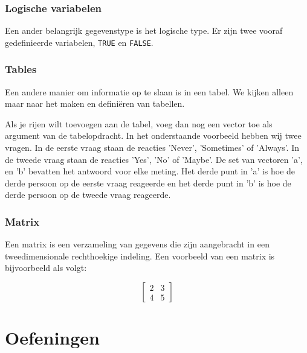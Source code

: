 

\subsubsection{Logische variabelen}

Een ander belangrijk gegevenstype is het logische type. Er zijn twee vooraf gedefinieerde variabelen, \texttt{TRUE} en \texttt{FALSE}.

\subsubsection{Tables}

Een andere  manier om informatie op te slaan is in een tabel.  We kijken alleen maar naar het maken en defini\"eren van tabellen. 



Als je rijen wilt toevoegen aan de tabel, voeg dan nog een vector toe als argument van de tabelopdracht. In het onderstaande voorbeeld hebben wij twee vragen. In de eerste vraag staan de reacties  'Never', 'Sometimes' of 'Always'. In de tweede vraag staan de reacties 'Yes', 'No' of 'Maybe'. De set van vectoren 'a', en 'b' bevatten het antwoord voor elke meting. Het derde punt in 'a' is hoe de derde persoon op de eerste vraag reageerde en het derde punt in 'b' is hoe de derde persoon op de tweede vraag reageerde.



\subsubsection{Matrix}

Een matrix is een verzameling van gegevens die zijn aangebracht in een tweedimensionale rechthoekige indeling. Een voorbeeld van een matrix is bijvoorbeeld als volgt:

\[
\begin{bmatrix}
2 & 3 \\ 
4 & 5  
\end{bmatrix}
\]



\section{Oefeningen}

